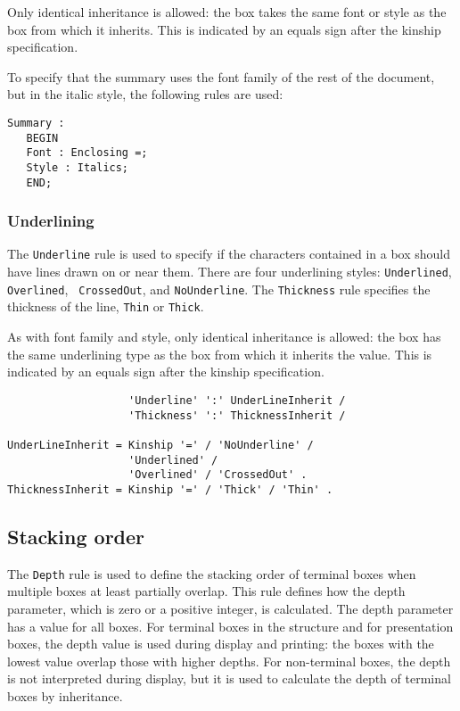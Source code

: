 Only identical inheritance is allowed: the box takes the same font or
style as the box from which it inherits.  This is indicated by an
equals sign after the kinship specification.

\begin{example}
To specify that the summary uses the font family of the rest of the
document, but in the italic style, the following rules are used:

\begin{verbatim}
Summary :
   BEGIN
   Font : Enclosing =;
   Style : Italics;
   END;
\end{verbatim}
\end{example}

\subsubsection{Underlining}
\label{underline}

The {\tt Underline} rule is used to specify if the characters
contained in a box should have lines drawn on or near them.  There are
four underlining styles: {\tt Underlined}, {\tt Overlined}, {\tt
CrossedOut}, and {\tt NoUnderline}.  The {\tt Thickness} rule
specifies the thickness of the line, {\tt Thin} or {\tt Thick}.

As with font family and style, only identical inheritance is allowed:
the box has the same underlining type as the box from which it
inherits the value.  This is indicated by an equals sign after the
kinship specification.

\begin{verbatim}
                   'Underline' ':' UnderLineInherit /
                   'Thickness' ':' ThicknessInherit /

UnderLineInherit = Kinship '=' / 'NoUnderline' /
                   'Underlined' / 
                   'Overlined' / 'CrossedOut' .
ThicknessInherit = Kinship '=' / 'Thick' / 'Thin' .
\end{verbatim}

\subsection{Stacking order}

The {\tt Depth} rule is used to define the stacking order of terminal
boxes when multiple boxes at least partially overlap.  This rule
defines how the depth parameter, which is zero or a positive integer,
is calculated.  The depth parameter has a value for all boxes.  For
terminal boxes in the structure and for presentation boxes, the depth
value is used during display and printing: the boxes with the lowest
value overlap those with higher depths.  For non-terminal boxes, the
depth is not interpreted during display, but it is used to calculate
the depth of terminal boxes by inheritance.

